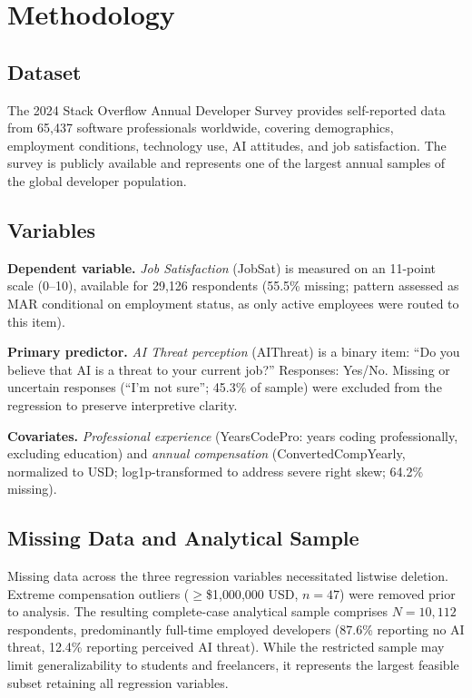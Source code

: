 \documentclass[11pt]{article}
\begin{document}
\section{Methodology}

\subsection{Dataset}

The 2024 Stack Overflow Annual Developer Survey provides self-reported data from
65{,}437 software professionals worldwide, covering demographics, employment conditions,
technology use, AI attitudes, and job satisfaction. The survey is publicly available
and represents one of the largest annual samples of the global developer population.

\subsection{Variables}

\textbf{Dependent variable.} \emph{Job Satisfaction} (JobSat) is measured on an 11-point
scale (0--10), available for 29{,}126 respondents (55.5\% missing; pattern assessed as
MAR conditional on employment status, as only active employees were routed to this item).

\textbf{Primary predictor.} \emph{AI Threat perception} (AIThreat) is a binary item:
``Do you believe that AI is a threat to your current job?'' Responses: Yes/No. Missing or
uncertain responses (``I'm not sure''; 45.3\% of sample) were excluded from the regression
to preserve interpretive clarity.

\textbf{Covariates.} \emph{Professional experience} (YearsCodePro: years coding
professionally, excluding education) and \emph{annual compensation} (ConvertedCompYearly,
normalized to USD; log1p-transformed to address severe right skew; 64.2\% missing).

\subsection{Missing Data and Analytical Sample}

Missing data across the three regression variables necessitated listwise deletion. Extreme
compensation outliers ($\geq$\$1{,}000{,}000 USD, $n = 47$) were removed prior to
analysis. The resulting complete-case analytical sample comprises $N = 10{,}112$
respondents, predominantly full-time employed developers (87.6\% reporting no AI threat,
12.4\% reporting perceived AI threat). While the restricted sample may limit
generalizability to students and freelancers, it represents the largest feasible subset
retaining all regression variables.
\end{document}

